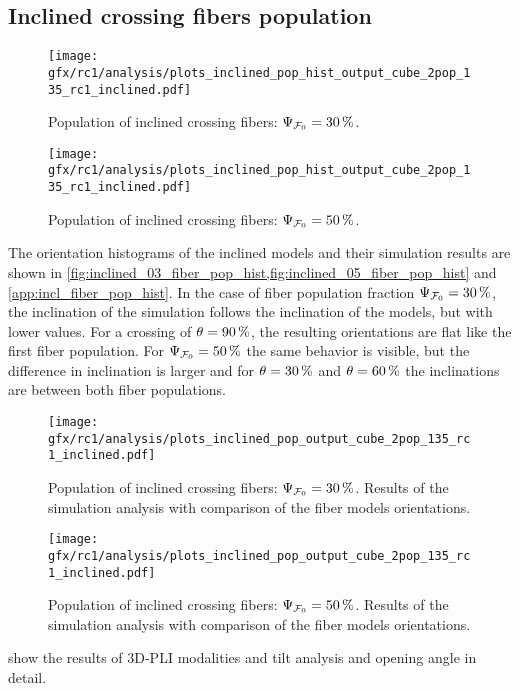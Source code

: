 \subsection{Inclined crossing fibers population}
\label{sec:resInclCross}
%
\begin{figure}[!p]
\centering
\texttt{[image: gfx/rc1/analysis/plots\_inclined\_pop\_hist\_output\_cube\_2pop\_135\_rc1\_inclined.pdf]}
\caption{Population of inclined crossing fibers: $\textnormal{$\Psi_{\textnormal{$\mathcal{F}_0$}}$}=\SI{30}{\percent}$.
}
\label{fig:inclined_03_fiber_pop_hist}
% 
\vspace{2em}
\texttt{[image: gfx/rc1/analysis/plots\_inclined\_pop\_hist\_output\_cube\_2pop\_135\_rc1\_inclined.pdf]}
\caption{Population of inclined crossing fibers: $\textnormal{$\Psi_{\textnormal{$\mathcal{F}_0$}}$}=\SI{50}{\percent}$.
}
\label{fig:inclined_05_fiber_pop_hist}
\end{figure}
%
The orientation histograms of the inclined models and their simulation results are shown in \cref{fig:inclined_03_fiber_pop_hist,fig:inclined_05_fiber_pop_hist} and \cref{app:incl_fiber_pop_hist}.
In the case of fiber population fraction $\textnormal{$\Psi_{\textnormal{$\mathcal{F}_0$}}$}=\SI{30}{\percent}$, the inclination of the simulation follows the inclination of the models, but with lower values.
For a crossing of $\textnormal{$\theta$}=\SI{90}{\percent}$, the resulting orientations are flat like the first fiber population.
For $\textnormal{$\Psi_{\textnormal{$\mathcal{F}_0$}}$}=\SI{50}{\percent}$ the same behavior is visible, but the difference in inclination is larger and for $\textnormal{$\theta$}=\SI{30}{\percent}$ and $\textnormal{$\theta$}=\SI{60}{\percent}$ the inclinations are between both fiber populations.
\par
%
\begin{figure}[!p]
\centering
\texttt{[image: gfx/rc1/analysis/plots\_inclined\_pop\_output\_cube\_2pop\_135\_rc1\_inclined.pdf]}
\caption{Population of inclined crossing fibers: $\textnormal{$\Psi_{\textnormal{$\mathcal{F}_0$}}$}=\SI{30}{\percent}$. Results of the simulation analysis with comparison of the fiber models orientations.}
\label{fig:inclined_03_fiber_pop_rofl}
\end{figure}
%
\begin{figure}[!p]
\centering
\texttt{[image: gfx/rc1/analysis/plots\_inclined\_pop\_output\_cube\_2pop\_135\_rc1\_inclined.pdf]}
\caption{Population of inclined crossing fibers: $\textnormal{$\Psi_{\textnormal{$\mathcal{F}_0$}}$}=\SI{50}{\percent}$. Results of the simulation analysis with comparison of the fiber models orientations.}
\label{fig:inclined_05_fiber_pop_rofl}
\end{figure}
%
 show the results of \ac{3D-PLI} modalities and tilt analysis and opening angle in detail.
